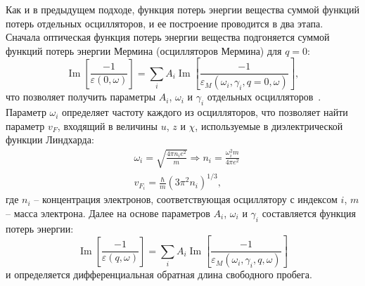 Как и в предыдущем подходе, функция потерь энергии вещества суммой функций потерь отдельных осцилляторов, и ее построение проводится в два этапа. Сначала оптическая функция потерь энергии вещества подгоняется суммой функций потерь энергии Мермина (осцилляторов Мермина) для $q=0$:
\begin{equation}
	\operatorname{Im}\left[\frac{-1}{\varepsilon(0, \omega)}\right]=\sum_i A_i \operatorname{Im}\left[\frac{-1}{\varepsilon_M\left(\omega_i, \gamma_i, q=0, \omega\right)}\right],
\end{equation}
что позволяет получить параметры $A_i$, $\omega_i$ и $\gamma_i$ отдельных осцилляторов~\cite{DeVera_MELF_params}. Параметр $\omega_i$ определяет частоту каждого из осцилляторов, что позволяет найти параметр $v_F$, входящий в величины $u$, $z$ и $\chi$, используемые в диэлектрической функции Линдхарда:
\begin{equation}
	\begin{aligned}
		&\omega_i=\sqrt{\frac{4 \pi n_i e^2}{m}} \Rightarrow n_i=\frac{\omega_i^2 m}{4 \pi e^2} \\
		&v_{F_i}=\frac{\hbar}{m}\left(3 \pi^2 n_i\right)^{1/3},
	\end{aligned}
\end{equation}
где $n_i$ -- концентрация электронов, соответствующая осциллятору с индексом $i$, $m$ -- масса электрона. Далее на основе параметров $A_i$, $\omega_i$ и $\gamma_i$ составляется функция потерь энергии:
\begin{equation}
	\operatorname{Im}\left[\frac{-1}{\varepsilon(q, \omega)}\right]=\sum_i A_i \operatorname{Im}\left[\frac{-1}{\varepsilon_M\left(\omega_i, \gamma_i, q, \omega\right)}\right]
\end{equation}
и определяется дифференциальная обратная длина свободного пробега.